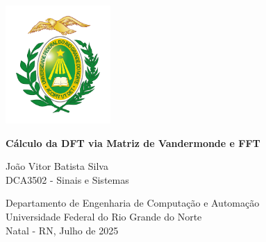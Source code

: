 \documentclass[12pt]{article}
\begin{document}
\begin{titlepage}
    \thispagestyle{empty}

    \begin{center}
        \vspace*{-0.5cm}
        \includegraphics[width=4cm]{imagens/brasao.png} \\
        {\Large\bfseries Cálculo da DFT via Matriz de Vandermonde e FFT \par}
    \end{center}

    \vfill
    \begin{flushright}
        \large João Vitor Batista Silva\\
        \large DCA3502 - Sinais e Sistemas
    \end{flushright}
    \vfill

    \begin{center}
        Departamento de Engenharia de Computação e Automação\\
        Universidade Federal do Rio Grande do Norte\\
        Natal - RN, Julho de 2025
    \end{center}
\end{titlepage}

\newpage

\begin{abstract}
Este relatório apresenta a implementação da Transformada de Fourier Discreta (DFT) utilizando duas abordagens distintas: a matriz de Vandermonde e o algoritmo FFT. Para ambas, foram utilizadas duas sequências de entrada com $N=8$ e $N=16$ amostras. Os resultados obtidos são analisados através dos espectros de amplitude e fase. Além disso, realiza-se uma comparação entre os dois métodos quanto à eficiência e complexidade computacional.
\end{abstract}
\newpage
\end{document}
